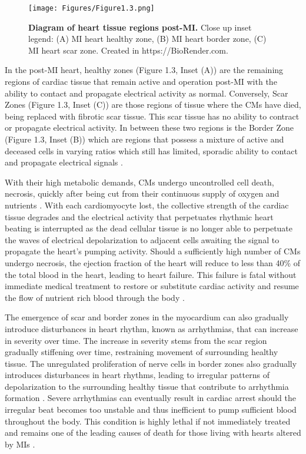 \begin{figure}[H]
    \centering
    \texttt{[image: Figures/Figure1.3.png]}
    \caption{\textbf{Diagram of heart tissue regions post-MI.} Close up inset legend: (A) MI heart healthy zone, (B) MI heart border zone, (C) MI heart scar zone. Created in  https://BioRender.com.}
    \label{fig:postMI}
\end{figure}

In the post-MI heart, healthy zones (Figure 1.3, Inset (A)) are the remaining regions of cardiac tissue that remain active and operation post-MI with the ability to contact and propagate electrical activity as normal. Conversely, Scar Zones (Figure 1.3, Inset (C)) are those regions of tissue where the CMs have died, being replaced with fibrotic scar tissue. This scar tissue has no ability to contract or propagate electrical activity. In between these two regions is the Border Zone (Figure 1.3, Inset (B)) which are regions that possess a mixture of active and deceased cells in varying ratios which still has limited, sporadic ability to contact and propagate electrical signals \cite{amoni_heterogeneity_2023, huethorst_development_2022}.

With their high metabolic demands, CMs undergo uncontrolled cell death, necrosis, quickly after being cut from their continuous supply of oxygen and nutrients \cite{huethorst_development_2022}. With each cardiomyocyte lost, the collective strength of the cardiac tissue degrades and the electrical activity that perpetuates rhythmic heart beating is interrupted as the dead cellular tissue is no longer able to perpetuate the waves of electrical depolarization to adjacent cells awaiting the signal to propagate the heart’s pumping activity. Should a sufficiently high number of CMs undergo necrosis, the ejection fraction of the heart will reduce to less than 40\% of the total blood in the heart, leading to heart failure. This failure is fatal without immediate medical treatment to restore or substitute cardiac activity and resume the flow of nutrient rich blood through the body \cite{golla_heart_2025}. 

The emergence of scar and border zones in the myocardium can also gradually introduce disturbances in heart rhythm, known as arrhythmias, that can increase in severity over time. The increase in severity stems from the scar region gradually stiffening over time, restraining movement of surrounding healthy tissue. The unregulated proliferation of nerve cells in border zones also gradually introduces disturbances in heart rhythms, leading to irregular patterns of depolarization to the surrounding healthy tissue that contribute to arrhythmia formation \cite{amoni_heterogeneity_2023, huethorst_development_2022}. Severe arrhythmias can eventually result in cardiac arrest should the irregular beat becomes too unstable and thus inefficient to pump sufficient blood throughout the body. This condition is highly lethal if not immediately treated and remains one of the leading causes of death for those living with hearts altered by MIs \cite{golla_heart_2025}.  




